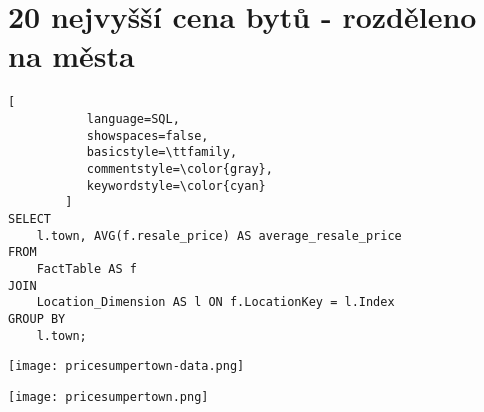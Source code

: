 \section{20 nejvyšší cena bytů - rozděleno na města}

\begin{lstlisting}[
           language=SQL,
           showspaces=false,
           basicstyle=\ttfamily,
           commentstyle=\color{gray},
           keywordstyle=\color{cyan}
        ]
SELECT 
    l.town, AVG(f.resale_price) AS average_resale_price 
FROM 
    FactTable AS f 
JOIN 
    Location_Dimension AS l ON f.LocationKey = l.Index 
GROUP BY 
    l.town;
\end{lstlisting}

\texttt{[image: pricesumpertown-data.png]}

\texttt{[image: pricesumpertown.png]}
